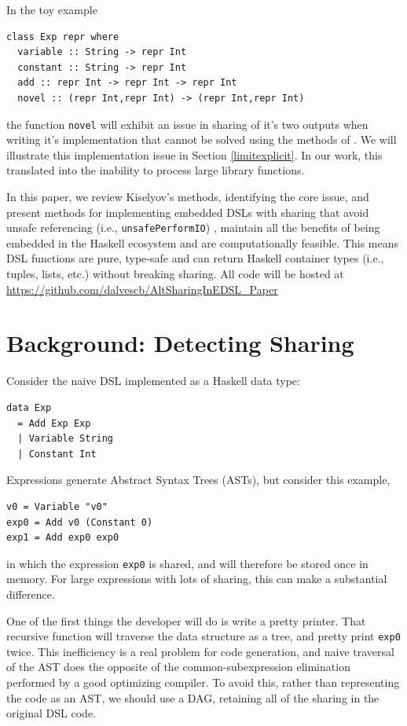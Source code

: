 \documentclass[runningheads]{llncs}
\begin{document}
In the toy example
\begin{verbatim}
class Exp repr where
  variable :: String -> repr Int
  constant :: String -> repr Int
  add :: repr Int -> repr Int -> repr Int
  novel :: (repr Int,repr Int) -> (repr Int,repr Int)
\end{verbatim}
the function \texttt{novel} will exhibit an issue in sharing of
it's two outputs when writing it's implementation that cannot be solved using
the methods of \cite{kiselyov:sharing}. We will illustrate this implementation
issue in Section \ref{limitexplicit}. In our work, this translated into the
inability to process large library functions.

\smallskip
In this paper, we review Kiselyov's methods, identifying the core issue, and
present methods for implementing embedded DSLs with sharing that avoid  unsafe referencing (i.e., \texttt{unsafePerformIO}) \cite{gill:observablesharing}, maintain all the benefits of being embedded in the Haskell ecosystem and are computationally feasible. This
means DSL functions are pure, type-safe and can return Haskell container types (i.e.,
tuples, lists, etc.) without breaking sharing. All code will be hosted at \url{https://github.com/dalvescb/AltSharingInEDSL_Paper}

\section{Background: Detecting Sharing}

Consider the naive DSL implemented as a Haskell data type:
\begin{verbatim}
data Exp
  = Add Exp Exp
  | Variable String
  | Constant Int
\end{verbatim}
Expressions generate Abstract Syntax Trees (ASTs),
but consider this example,
\begin{verbatim}
v0 = Variable "v0"
exp0 = Add v0 (Constant 0)
exp1 = Add exp0 exp0
\end{verbatim}
in which the expression  \texttt{exp0} is shared,
and will therefore be stored once in memory.
For large expressions with lots of sharing,
this can make a substantial difference.

One of the first things the developer will do is write a pretty printer.
That recursive function will traverse the data structure as a tree,
and pretty print \texttt{exp0} twice.
This inefficiency is a real problem for code generation,
and naive traversal of the AST does the opposite of the common-subexpression elimination performed by a good optimizing compiler.
To avoid this,
rather than representing the code as an AST, 
we should use a DAG, retaining all of the sharing in the original DSL code. 
\end{document}
